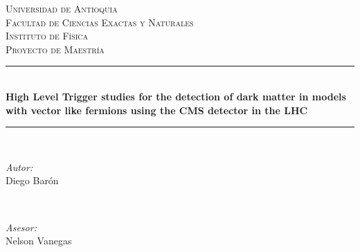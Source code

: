 \begin{titlepage}

\newcommand{\HRule}{\rule{\linewidth}{0.5mm}} %

\center %
 

\textsc{\LARGE Universidad de Antioquia}\\[1.5cm] %
\textsc{\Large Facultad de Ciencias Exactas y Naturales}\\[0.5cm]
\textsc{\Large Instituto de Física}\\[0.5cm]
\textsc{\large Proyecto de Maestría}\\[0.5cm] %


\HRule \\[0.4cm]
{ \huge \bfseries High Level Trigger studies for the detection of dark matter in models with vector like fermions using the CMS detector in the LHC}\\[0.4cm] %
\HRule \\[1.5cm]
 

\begin{minipage}{0.4\textwidth}
\begin{flushleft} \large
\emph{Autor:}\\
Diego Barón \textsc{} %
\end{flushleft}
\end{minipage}
~
\begin{minipage}{0.4\textwidth}
\begin{flushright} \large
\emph{Asesor:} \\
Nelson Vanegas \textsc{} %
\end{flushright}
\end{minipage}\\[1.2cm]


\end{titlepage}
